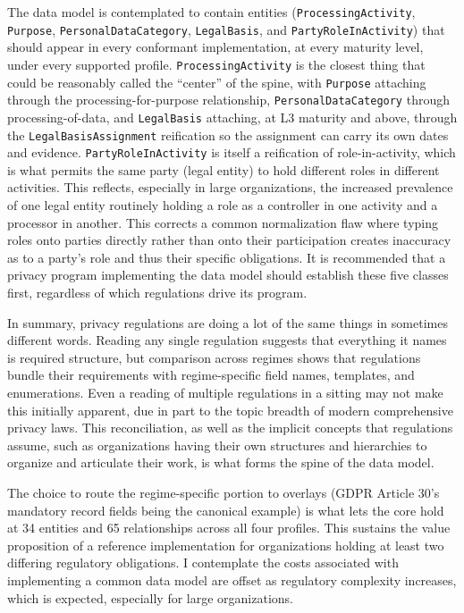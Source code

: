 \documentclass[10pt,letterpaper,twocolumn,twoside]{rho-class/rho}
\begin{document}
The data model is contemplated to contain entities (\texttt{ProcessingActivity}, \texttt{Purpose}, \texttt{PersonalDataCategory}, \texttt{LegalBasis}, and \texttt{PartyRoleInActivity}) that should appear in every conformant implementation, at every maturity level, under every supported profile. \texttt{ProcessingActivity} is the closest thing that could be reasonably called the ``center'' of the spine, with \texttt{Purpose} attaching through the processing-for-purpose relationship, \texttt{PersonalDataCategory} through processing-of-data, and \texttt{LegalBasis} attaching, at L3 maturity and above, through the \texttt{LegalBasisAssignment} reification so the assignment can carry its own dates and evidence. \texttt{PartyRoleInActivity} is itself a reification of role-in-activity, which is what permits the same party (legal entity) to hold different roles in different activities. This reflects, especially in large organizations, the increased prevalence of one legal entity routinely holding a role as a controller in one activity and a processor in another. This corrects a common normalization flaw where typing roles onto parties directly rather than onto their participation creates inaccuracy as to a party's role and thus their specific obligations. It is recommended that a privacy program implementing the data model should establish these five classes first, regardless of which regulations drive its program.

In summary, privacy regulations are doing a lot of the same things in sometimes different words. Reading any single regulation suggests that everything it names is required structure, but comparison across regimes shows that regulations bundle their requirements with regime-specific field names, templates, and enumerations. Even a reading of multiple regulations in a sitting may not make this initially apparent, due in part to the topic breadth of modern comprehensive privacy laws. This reconciliation, as well as the implicit concepts that regulations assume, such as organizations having their own structures and hierarchies to organize and articulate their work, is what forms the spine of the data model.  

The choice to route the regime-specific portion to overlays (GDPR Article 30's mandatory record fields being the canonical example) is what lets the core hold at 34 entities and 65 relationships across all four profiles. This sustains the value proposition of a reference implementation for organizations holding at least two differing regulatory obligations. I contemplate the costs associated with implementing a common data model are offset as regulatory complexity increases, which is expected, especially for large organizations.
\end{document}
